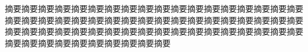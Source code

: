 
\chapter*{\xiaosan{}}
 

摘要摘要摘要摘要摘要摘要摘要摘要摘要摘要摘要摘要摘要摘要摘要摘要摘要摘要摘要摘要摘要摘要摘要摘要摘要摘要摘要摘要摘要摘要摘要摘要摘要摘要摘要摘要摘要摘要摘要摘要摘要摘要摘要摘要摘要摘要摘要摘要摘要摘要摘要摘要摘要摘要摘要摘要摘要摘要摘要摘要摘要摘要摘要摘要

\vspace{0.5cm}


